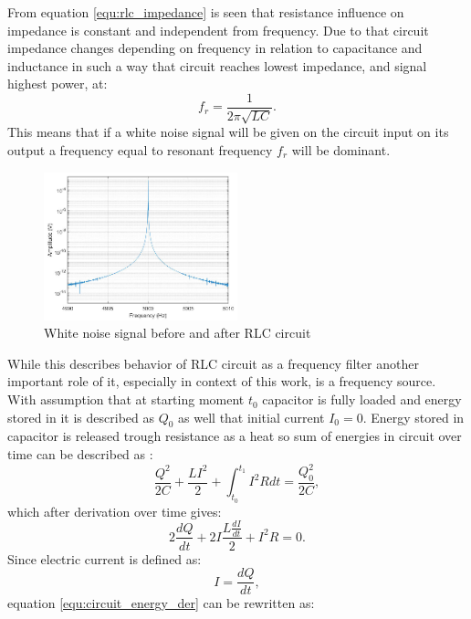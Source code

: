 From equation \ref{equ:rlc_impedance} is seen that resistance influence on impedance is 
constant and independent from frequency. Due to that circuit impedance changes depending on
frequency in relation to capacitance and inductance in such a way that circuit reaches lowest
impedance, and signal highest power, at:
\begin{equation}
	\label{fig:rlc_resonance}
	f_{r} = \frac{1}{2\pi \sqrt{LC}}.
\end{equation}
This means that if a white noise signal will be given on the circuit input on its output 
a frequency equal to resonant frequency $f_{r}$ will be dominant.
\begin{figure}[htb] 
	\label{fig:white_rlc_filter}
	\centering
	\includegraphics[width=0.5\textwidth]{figures/filtered_noise}
	\caption{White noise signal before and after RLC circuit}
\end{figure}
While this describes behavior of RLC circuit as a frequency filter another important role of it,
especially in context of this work, is a frequency source.
With assumption that at starting moment $t_{0}$ capacitor is fully loaded and energy stored
in it is described as $Q_{0}$ as well that initial current $I_{0}=0$.
Energy stored in capacitor is released trough resistance as a heat so sum of energies in 
circuit over time can be described as :
\begin{equation}
	\label{equ:circuit_energy}
	\frac{Q^{2}}{2C}+\frac{LI^{2}}{2}+\int_{t_{0}}^{t_{1}}I^{2}R dt = \frac{Q_{0}^{2}}{2C},
\end{equation}
which after derivation over time gives:
\begin{equation}
	\label{equ:circuit_energy_der}
	2\frac{dQ}{dt} + 2I \frac{L\frac{dI}{dt} }{2} + I^{2}R = 0.
\end{equation}
Since electric current is defined as:
\begin{equation}
	\label{equ:current_as_power}
	I = \frac{dQ}{dt},
\end{equation}
equation \ref{equ:circuit_energy_der} can be rewritten as:
